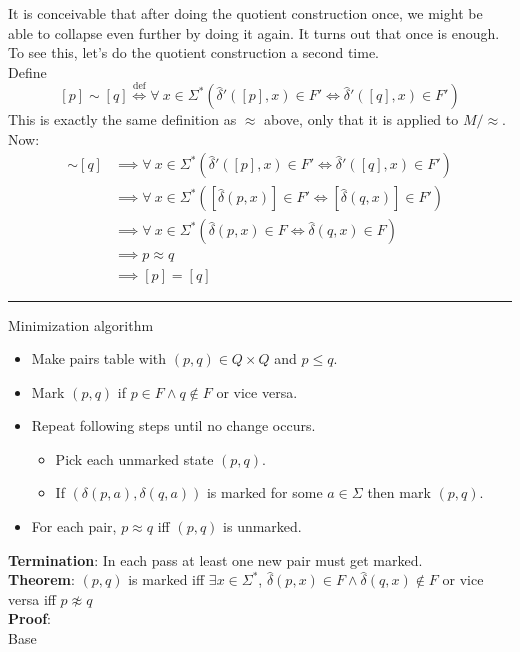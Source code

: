 \documentclass{report}
\newcommand{\dhat}{\hat{\delta}}
\newcommand{\hr}{\hrule\vspace{4mm}}
\begin{document}
It is conceivable that after doing the quotient construction once, we might be able to collapse even further by doing it again. It turns out that once is enough. To see this, let's do the quotient construction a second time. \\
Define \\
$$
  [p] \sim [q] \overset{\text{def}}{\iff} \forall \ x \in \Sigma^* (\dhat'([p],x) \in F' \iff \dhat'([q],x) \in F')
$$
This is exactly the same definition as $\approx$ above, only that it is applied to $M/\approx$. Now:
\begin{align*}
  [p] \sim [q] & \implies \forall \ x \in \Sigma^* (\dhat'([p],x) \in F' \iff \dhat'([q],x) \in F') \\
               & \implies \forall \ x \in \Sigma^* ([\dhat(p,x)] \in F' \iff [\dhat(q,x)] \in F')   \\
               & \implies \forall \ x \in \Sigma^* (\dhat(p,x) \in F \iff \dhat(q,x) \in F)         \\
               & \implies p \approx q                                                               \\
               & \implies [p] = [q]
\end{align*}

\hr

{\Large Minimization algorithm}

\begin{itemize}
  \item Make pairs table with $(p, q) \in Q \times Q$ and $p \leq q$.
  \item Mark $(p, q)$ if $p \in F \wedge q \notin F$ or vice versa.
  \item Repeat following steps until no change occurs.
        \begin{itemize}
          \item Pick each unmarked state $(p, q)$.
          \item If $(\delta(p, a), \delta(q, a))$ is marked for some $a \in \Sigma$ then mark $(p, q)$.
        \end{itemize}
  \item For each pair, $p \approx q$ iff $(p, q)$ is unmarked.
\end{itemize}
\textbf{Termination}: In each pass at least one new pair must get marked. \\

\textbf{Theorem}: $(p, q)$ is marked iff $\exists x \in \Sigma^*$, $\dhat(p, x) \in F \wedge \dhat(q, x) \notin F$ or vice versa iff $p \not \approx q$ \\
\textbf{Proof}: \\
Base \\
\end{document}
